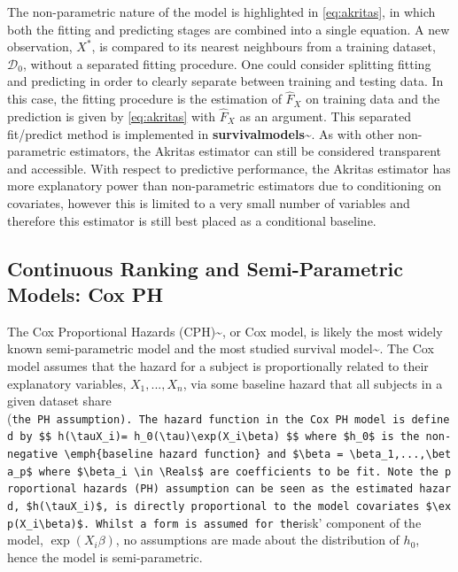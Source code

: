 \documentclass[
  letterpaper,
]{scrbook}
\theoremstyle{plain}
\theoremstyle{definition}
\theoremstyle{remark}
\begin{document}
The non-parametric nature of the model is highlighted in
\ref{eq:akritas}, in which both the fitting and predicting stages are
combined into a single equation. A new observation, \(X^*\), is compared
to its nearest neighbours from a training dataset, \(\mathcal{D}_0\),
without a separated fitting procedure. One could consider splitting
fitting and predicting in order to clearly separate between training and
testing data. In this case, the fitting procedure is the estimation of
\(\hat{F}_X\) on training data and the prediction is given by
\ref{eq:akritas} with \(\hat{F}_X\) as an argument. This separated
fit/predict method is implemented in
\textbf{survivalmodels}\textasciitilde{}\cite{pkgsurvivalmodels}. As
with other non-parametric estimators, the Akritas estimator can still be
considered transparent and accessible. With respect to predictive
performance, the Akritas estimator has more explanatory power than
non-parametric estimators due to conditioning on covariates, however
this is limited to a very small number of variables and therefore this
estimator is still best placed as a conditional baseline.

\subsection{Continuous Ranking and Semi-Parametric Models: Cox PH}
\label{sec:surv_models_crank}

The Cox Proportional Hazards (CPH)\textasciitilde{}\cite{Cox1972}, or
Cox model, is likely the most widely known semi-parametric model and the
most studied survival
model\textasciitilde{}\cite{Habibi2018, Moghimi-dehkordi2008, Reid1994, Wang2017}.
The Cox model assumes that the hazard for a subject is proportionally
related to their explanatory variables, \(X_1,...,X_n\), via some
baseline hazard that all subjects in a given dataset share
(\texttt{the\ PH\ assumption\textquotesingle{}).\ The\ hazard\ function\ in\ the\ Cox\ PH\ model\ is\ defined\ by\ \$\$\ h(\textbackslash{}tau\textbar{}X\_i)=\ h\_0(\textbackslash{}tau)\textbackslash{}exp(X\_i\textbackslash{}beta)\ \$\$\ where\ \$h\_0\$\ is\ the\ non-negative\ \textbackslash{}emph\{baseline\ hazard\ function\}\ and\ \$\textbackslash{}beta\ =\ \textbackslash{}beta\_1,...,\textbackslash{}beta\_p\$\ where\ \$\textbackslash{}beta\_i\ \textbackslash{}in\ \textbackslash{}Reals\$\ are\ coefficients\ to\ be\ fit.\ Note\ the\ proportional\ hazards\ (PH)\ assumption\ can\ be\ seen\ as\ the\ estimated\ hazard,\ \$h(\textbackslash{}tau\textbar{}X\_i)\$,\ is\ directly\ proportional\ to\ the\ model\ covariates\ \$\textbackslash{}exp(X\_i\textbackslash{}beta)\$.\ Whilst\ a\ form\ is\ assumed\ for\ the}risk'
component of the model, \(\exp(X_i\beta)\), no assumptions are made
about the distribution of \(h_0\), hence the model is semi-parametric.
\end{document}
